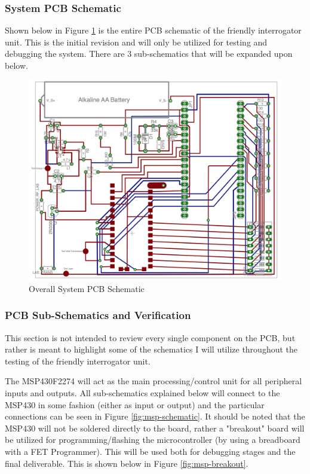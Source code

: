 \documentclass[letterpaper,10pt]{article}
\begin{document}
\begin{spacing}{1.15}
\subsubsection{System PCB Schematic}
Shown below in Figure \ref{fig:system-pcb} is the entire PCB schematic of the friendly interrogator unit. This is the initial revision and will only be utilized for testing and debugging the system. There are 3 sub-schematics that will be expanded upon below.
\begin{figure} [H]
	\centering
	\includegraphics[scale=0.4]{system-pcb.png}
	\caption{Overall System PCB Schematic\label{fig:system-pcb}}
\end{figure}

\subsubsection{PCB Sub-Schematics and Verification}
This section is not intended to review every single component on the PCB, but rather is meant to highlight some of the schematics I will utilize throughout the testing of the friendly interrogator unit.

The MSP430F2274 will act as the main processing/control unit for all peripheral inputs and outputs. All sub-schematics explained below will connect to the MSP430 in some fashion (either as input or output) and the particular connections can be seen in Figure \ref{fig:msp-schematic}. It should be noted that the MSP430 will not be soldered directly to the board, rather a "breakout" board will be utilized for programming/flashing the microcontroller (by using a breadboard with a FET Programmer). This will be used both for debugging stages and the final deliverable. This is shown below in Figure \ref{fig:msp-breakout}.


\end{spacing}
\end{document}
